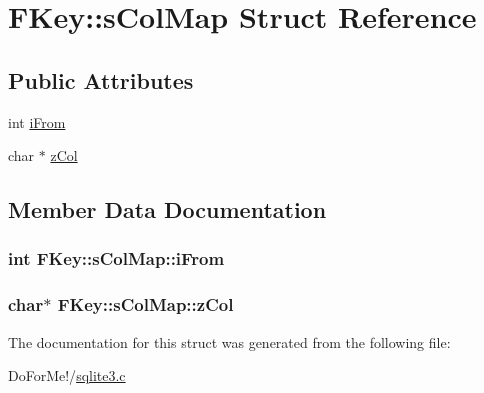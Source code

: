 \hypertarget{struct_f_key_1_1s_col_map}{\section{F\-Key\-:\-:s\-Col\-Map Struct Reference}
\label{struct_f_key_1_1s_col_map}
}
\subsection*{Public Attributes}
\begin{DoxyCompactItemize}
\item 
int \hyperlink{struct_f_key_1_1s_col_map_a2b0ed19d4924a93d1f3f14f891b176ed}{i\-From}
\item 
char $\ast$ \hyperlink{struct_f_key_1_1s_col_map_a4cdef475be73cc460873051a2c2c2937}{z\-Col}
\end{DoxyCompactItemize}


\subsection{Member Data Documentation}
\hypertarget{struct_f_key_1_1s_col_map_a2b0ed19d4924a93d1f3f14f891b176ed}{
\subsubsection[{i\-From}]{\setlength{\rightskip}{0pt plus 5cm}int F\-Key\-::s\-Col\-Map\-::i\-From}}\label{struct_f_key_1_1s_col_map_a2b0ed19d4924a93d1f3f14f891b176ed}
\hypertarget{struct_f_key_1_1s_col_map_a4cdef475be73cc460873051a2c2c2937}{
\subsubsection[{z\-Col}]{\setlength{\rightskip}{0pt plus 5cm}char$\ast$ F\-Key\-::s\-Col\-Map\-::z\-Col}}\label{struct_f_key_1_1s_col_map_a4cdef475be73cc460873051a2c2c2937}


The documentation for this struct was generated from the following file\-:\begin{DoxyCompactItemize}
\item 
Do\-For\-Me!/\hyperlink{sqlite3_8c}{sqlite3.\-c}\end{DoxyCompactItemize}
